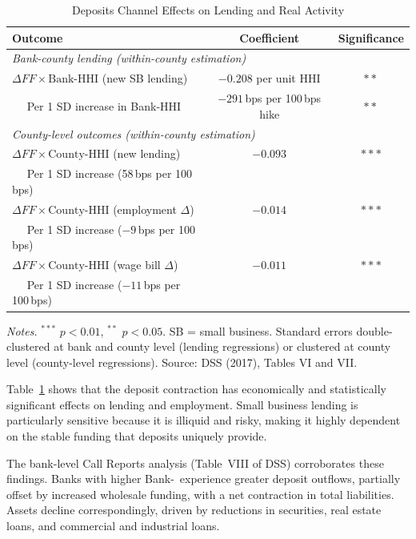 \documentclass[12pt,a4paper]{article}
\newcommand{\HHI}{\text{HHI}}
\begin{document}
\begin{table}[H]
\centering
\caption{Deposits Channel Effects on Lending and Real Activity}
\label{tab:lending_results}
\small
\begin{tabular}{lcc}
\toprule
\textbf{Outcome} & \textbf{Coefficient} & \textbf{Significance} \\
\midrule
\multicolumn{3}{l}{\textit{Bank-county lending (within-county estimation)}} \\
$\Delta FF \times \text{Bank-HHI}$ (new SB lending) & $-0.208$ per unit HHI & $**$ \\
$\quad$ Per 1 SD increase in Bank-HHI & $-291$\,bps per 100\,bps hike & $**$ \\[6pt]
\multicolumn{3}{l}{\textit{County-level outcomes (within-county estimation)}} \\
$\Delta FF \times \text{County-HHI}$ (new lending) & $-0.093$ & $***$ \\
$\quad$ Per 1 SD increase (58\,bps per 100\,bps) & & \\
$\Delta FF \times \text{County-HHI}$ (employment $\Delta$) & $-0.014$ & $***$ \\
$\quad$ Per 1 SD increase ($-9$\,bps per 100\,bps) & & \\
$\Delta FF \times \text{County-HHI}$ (wage bill $\Delta$) & $-0.011$ & $***$ \\
$\quad$ Per 1 SD increase ($-11$\,bps per 100\,bps) & & \\
\bottomrule
\end{tabular}

\vspace{4pt}
\footnotesize
\textit{Notes.} $^{***}$ $p<0.01$, $^{**}$ $p<0.05$. SB = small business.
Standard errors double-clustered at bank and county level (lending regressions)
or clustered at county level (county-level regressions). Source: DSS (2017),
Tables VI and VII.
\end{table}

Table~\ref{tab:lending_results} shows that the deposit contraction has
economically and statistically significant effects on lending and employment.
Small business lending is particularly sensitive because it is illiquid and
risky, making it highly dependent on the stable funding that deposits uniquely
provide.

The bank-level Call Reports analysis (Table~VIII of DSS) corroborates these
findings. Banks with higher Bank-\HHI\ experience greater deposit outflows,
partially offset by increased wholesale funding, with a net contraction in
total liabilities. Assets decline correspondingly, driven by reductions in
securities, real estate loans, and commercial and industrial loans.
\end{document}
